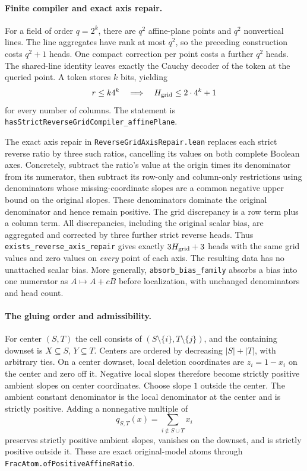 \documentclass[11pt]{article}
\begin{document}
\paragraph{Finite compiler and exact axis repair.}
For a field of order $q=2^k$, there are $q^2$ affine-plane points and
$q^2$ nonvertical lines.  The line aggregates have rank at most $q^2$,
so the preceding construction costs $q^2+1$ heads.  One compact
correction per point costs a further $q^2$ heads.  The shared-line
identity leaves exactly the Cauchy decoder of the token at the queried
point.  A token stores $k$ bits, yielding
\[
 r\leq k4^k\quad\Longrightarrow\quad
 H_{\rm grid}\leq2\cdot4^k+1
\]
for every number of columns.  The statement is
\texttt{hasStrictReverseGridCompiler\_affinePlane}.

The exact axis repair in \texttt{ReverseGridAxisRepair.lean} replaces
each strict reverse ratio by three such ratios, cancelling its values
on both complete Boolean axes.  Concretely, subtract the ratio's value
at the origin times its denominator from its numerator, then subtract
its row-only and column-only restrictions using denominators whose
missing-coordinate slopes are a common negative upper bound on the
original slopes.  These denominators dominate the original denominator
and hence remain positive.  The grid discrepancy is a row term plus a
column term.  All discrepancies, including the original scalar bias,
are aggregated and corrected by three further strict reverse heads.
Thus \texttt{exists\_reverse\_axis\_repair} gives exactly
$3H_{\rm grid}+3$ heads with the same grid values and zero values on
\emph{every} point of each axis.  The resulting data has no unattached
scalar bias.  More generally, \texttt{absorb\_bias\_family} absorbs a
bias into one numerator as $A\mapsto A+cB$ before localization, with
unchanged denominators and head count.

\paragraph{The gluing order and admissibility.}
For center $(S,T)$ the cell consists of
$(S\setminus\{i\},T\setminus\{j\})$, and the containing downset is
$X\subseteq S$, $Y\subseteq T$.  Centers are ordered by decreasing
$|S|+|T|$, with arbitrary ties.  On a center downset, local deletion
coordinates are $z_i=1-x_i$ on the center and zero off it.  Negative
local slopes therefore become strictly positive ambient slopes on
center coordinates.  Choose slope $1$ outside the center.  The ambient
constant denominator is the local denominator at the center and is
strictly positive.  Adding a nonnegative multiple of
\[
 q_{S,T}(x)=\sum_{i\notin S\cup T}x_i
\]
preserves strictly positive ambient slopes, vanishes on the downset,
and is strictly positive outside it.  These are exact original-model
atoms through \texttt{FracAtom.ofPositiveAffineRatio}.
\end{document}
